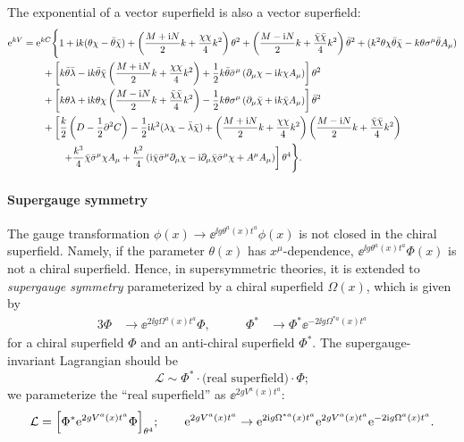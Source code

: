 \documentclass[CheatSheet]{subfiles}
\begin{document}
The exponential of a vector superfield is also a vector superfield:
\begin{equation}
\begin{split}
 {\mathrm{e}}^{kV}&={\mathrm{e}}^{kC}\Bigg\{
 1+{\mathrm{i}} k (\theta \chi-\bar\theta\bar{\chi})
 +\left(\frac{M+{\mathrm{i}} N}{2}k+\frac{\chi\chi}{4}k^2\right) \theta^2
 +\left(\frac{M-{\mathrm{i}} N}{2}k+\frac{\bar\chi\bar\chi}{4}k^2\right) \bar\theta^2
 +(k^2\theta \chi\bar\theta\bar{\chi}-k\theta \sigma^{\mu}\bar\theta A_{\mu})
 \\&\qquad
 +\left[k\bar\theta \bar\lambda-{\mathrm{i}} k \bar\theta \bar\chi\left(\frac{M+{\mathrm{i}} N}{2}k+\frac{\chi\chi}{4}k^2\right)
 +\frac12 k\bar\theta\bar\sigma^{\mu}\left(\partial_{\mu}\chi -{\mathrm{i}} k \chi A_\mu\right)
 \right] \theta^2
 \\&\qquad
 +\left[k\theta \lambda+{\mathrm{i}} k \theta \chi\left(\frac{M-{\mathrm{i}} N}{2}k+\frac{\bar{\chi}\bar{\chi}}{4}k^2\right)
 -\frac12 k\theta \sigma^{\mu}\left(\partial_{\mu}\bar{\chi}+{\mathrm{i}} k \bar\chi A_\mu\right)
 \right] \bar\theta^2
 \\&\qquad
 +\left[
 \frac{k}{2} \left(D-\frac12\partial^2 C\right)
 -\frac{1}{2} {\mathrm{i}} k^2 (\lambda\chi-\bar\lambda\bar\chi)
 + \left(\frac{M+{\mathrm{i}} N}{2}k+\frac{\chi\chi}{4}k^2\right)\left(\frac{M-{\mathrm{i}} N}{2}k+\frac{\bar\chi\bar\chi}{4}k^2\right)
 \right.\\&\qquad\qquad\left.
 +\frac{k^3}{4} \bar\chi\bar\sigma^{\mu}\chi A_{\mu}
 +\frac{k^2}{4}\left({\mathrm{i}} \bar\chi\bar\sigma^{\mu}\partial_{\mu}\chi-{\mathrm{i}} \partial_{\mu}\bar\chi\bar\sigma^{\mu}\chi+A^{\mu}A_{\mu}\right)
 \right]\theta^4\Bigg\}.
\end{split}
\end{equation}
\paragraph{Supergauge symmetry}
The gauge transformation $\phi(x)\to\ee^{\ii g \theta^a(x)t^a}\phi(x)$ is not closed in the chiral superfield.
Namely, if the parameter $\theta(x)$ has $x^\mu$-dependence, $\ee^{\ii g \theta^a(x)t^a}\Phi(x)$ is not a chiral superfield.
Hence, in supersymmetric theories, it is extended to \emph{supergauge symmetry} parameterized by a chiral superfield $\Omega(x)$, which is given by
\begin{alignat}{3}
 \Phi   &\to\ee^{2\ii g \Omega^a(x) t^a}\Phi,
&\qquad
 \Phi^* &\to\Phi^*\ee^{-2\ii g \Omega^{*a}(x) t^a}
\end{alignat}
for a chiral superfield $\Phi$ and an anti-chiral superfield $\Phi^*$.
The supergauge-invariant Lagrangian should be
\begin{equation}
 \mathcal L \sim \Phi^*\cdot\text{(real superfield)}\cdot\Phi;
\end{equation}
we parameterize the ``real superfield'' as $\ee^{2g V^a(x)t^a}$:
\begin{equation}
 \mathcal L = \Bigl[\Phi^*{\mathrm{e}}^{2g V^a(x)t^a}\Phi\Bigr]_{\theta^4};
\qquad
 {\mathrm{e}}^{2g V^a(x)t^a}\to
{\mathrm{e}}^{2{\mathrm{i}} g \Omega^{*a}(x) t^a}
 {\mathrm{e}}^{2g V^a(x)t^a}
{\mathrm{e}}^{-2{\mathrm{i}} g \Omega^a(x) t^a}.
\end{equation}
\end{document}
